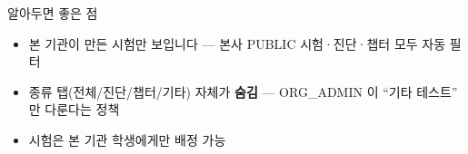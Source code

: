 \begin{tipbox}{알아두면 좋은 점}
\begin{itemize}[leftmargin=1.2em]
  \item 본 기관이 만든 시험만 보입니다 — 본사 PUBLIC 시험·진단·챕터 모두 자동 필터
  \item 종류 탭(전체/진단/챕터/기타) 자체가 \textbf{숨김} — ORG\_ADMIN 이 ``기타 테스트'' 만 다룬다는 정책
  \item 시험은 본 기관 학생에게만 배정 가능
\end{itemize}
\end{tipbox}
